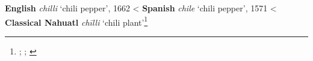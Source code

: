 \begin{etymology}\label{ety:chile}
\textbf{English} \textit{chilli} `chili pepper', 1662
< \textbf{Spanish} \textit{chile} `chili pepper', 1571
< \textbf{Classical Nahuatl} \textit{chīlli} `chili plant'\footnote{\textcite[s.v. chilli]{oed}; \textcite[s.v. chile]{dle}; \textcite[s.v. chilli]{ond}}
\end{etymology}